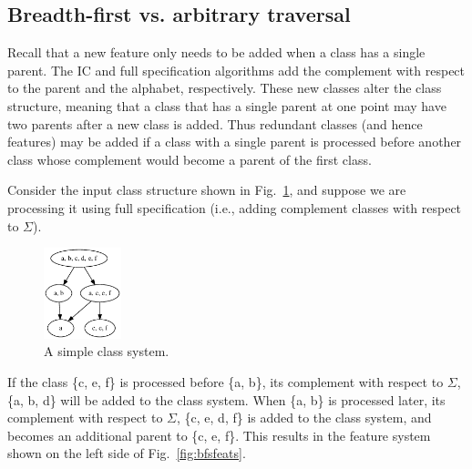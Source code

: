 \documentclass[12pt, oneside]{article}   	%
\begin{document}
\subsection{Breadth-first vs. arbitrary traversal}
\label{app:bfs}

Recall that a new feature only needs to be added when a class has a single parent. The IC and full specification algorithms add the complement with respect to the parent and the alphabet, respectively. These new classes alter the class structure, meaning that a class that has a single parent at one point may have two parents after a new class is added. Thus redundant classes (and hence features) may be added if a class with a single parent is processed before another class whose complement would become a parent of the first class.

Consider the input class structure shown in Fig.~\ref{fig:bfs1}, and suppose we are processing it using full specification (i.e., adding complement classes with respect to $\Sigma$). 

\begin{figure}[htb!]
	\centering
	\includegraphics[width=0.2\textwidth]{bfs1.png}
	\caption{A simple class system.}
	\label{fig:bfs1}
\end{figure}

If the class \{c, e, f\} is processed before \{a, b\}, its complement with respect to $\Sigma$, \{a, b, d\} will be added to the class system. When \{a, b\} is processed later, its complement with respect to $\Sigma$, \{c, e, d, f\} is added to the class system, and becomes an additional parent to \{c, e, f\}. This results in the feature system shown on the left side of Fig.~\ref{fig:bfsfeats}.
\end{document}

